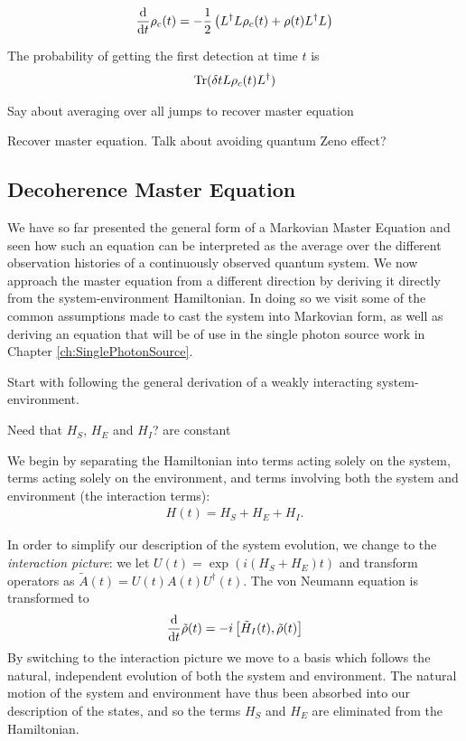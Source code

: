 \begin{align}
  \frac{\mathrm{d}}{\mathrm{d}t} \rho_c(t) = - \frac{1}{2} \left(L^\dagger L \rho_c(t) + \rho(t) L^\dagger L \right)
\end{align}

The probability of getting the first detection at time $t$ is 
\begin{align}
 \operatorname{Tr}(\delta t L \rho_c(t) L^\dagger)
\end{align}


Say about averaging over all jumps to recover master equation

Recover master equation. Talk about avoiding quantum Zeno effect? 


\subsection{Decoherence Master Equation}

We have so far presented the general form of a Markovian Master Equation and seen how such an equation can be interpreted as the average over the different observation histories of a continuously observed quantum system. We now approach the master equation from a different direction by deriving it directly from the system-environment Hamiltonian. In doing so we visit some of the common assumptions made to cast the system into Markovian form, as well as deriving an equation that will be of use in the single photon source work in Chapter \ref{ch:SinglePhotonSource}.

Start with following the general derivation of a weakly interacting system-environment.

Need that $H_S$, $H_E$ and $H_I$? are constant

We begin by separating the Hamiltonian into terms acting solely on the system, terms acting solely on the environment, and terms involving both the system and environment (the interaction terms):
\begin{align}
  H(t) = H_S + H_E + H_I.
\end{align}

In order to simplify our description of the system evolution, we change to the \textit{interaction picture}: we let $U(t) = \exp(i(H_S + H_E)t)$ and transform operators as $\tilde{A}(t) = U(t)A(t)U^\dagger(t)$. The von Neumann equation is transformed to
\begin{align}
  \label{i_von_neumann_eq}
  \frac{\mathrm{d}}{\mathrm{d}t} \tilde{\rho}(t) = -i\left[ \tilde{H}_I(t), \tilde{\rho}(t) \right]
\end{align}
By switching to the interaction picture we move to a basis which follows the natural, independent evolution of both the system and environment. The natural motion of the system and environment have thus been absorbed into our description of the states, and so the terms $H_S$ and $H_E$ are eliminated from the Hamiltonian.


